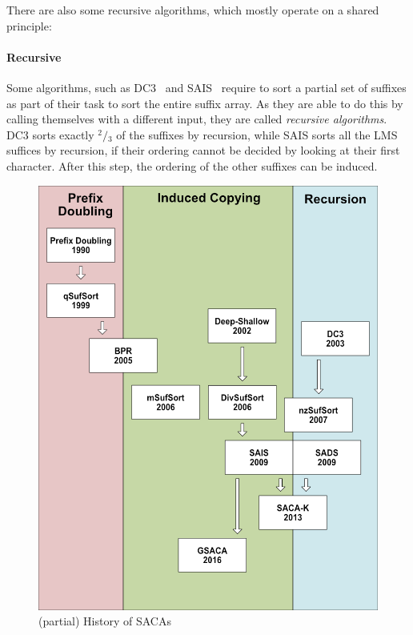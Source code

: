 \bigskip

There are also some recursive algorithms, which mostly operate on a shared principle:
%
\paragraph{Recursive} Some algorithms, such as DC3~\cite{xxx} and SAIS~\cite{xxx} require to sort a
partial set of suffixes as part of their task to sort the entire suffix array.
As they are able to do this by calling themselves with a different input, they are called \emph{recursive algorithms}.
DC3 sorts exactly $^2\!/\!_3$ of the suffixes by recursion, while SAIS sorts all the LMS suffices by recursion,
if their ordering cannot be decided by looking at their first character.
After this step, the ordering of the other suffixes can be induced.

\begin{figure}[!t]
    \includegraphics[width=\textwidth]{kapitel/5_saca_uebersicht/history/history3_eng.png}
    \caption{(partial) History of SACAs}
    \label{ea:fig:history}
\end{figure}

